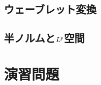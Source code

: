 \documentclass[../../main]{subfiles}
\begin{document}
\subsection{ウェーブレット変換}

\begin{subappendices}
\section{半ノルムと\texorpdfstring{\(L^p\)}{Lp}空間}
\end{subappendices}

\section*{演習問題}
\end{document}

